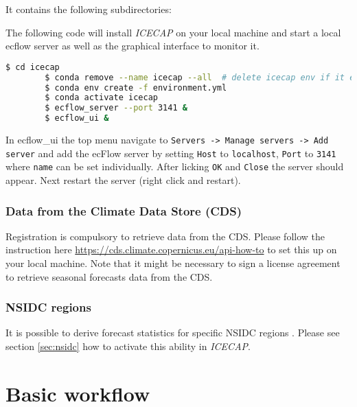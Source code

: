 \documentclass[DIV=10, parskip=full]{scrreprt}
\newcommand{\ice}{\textit{ICECAP}\xspace}
\begin{document}
It contains the following subdirectories:




The following code will install \ice on your local machine and start a local ecflow server as well as the graphical interface to monitor it.\\
	
	\begin{lstlisting}[language=bash]
		$ cd icecap
		$ conda remove --name icecap --all  # delete icecap env if it exists
		$ conda env create -f environment.yml 
		$ conda activate icecap
		$ ecflow_server --port 3141 &
		$ ecflow_ui & 
	\end{lstlisting}
	In ecflow\_ui the top menu navigate to \texttt{Servers -> Manage servers -> Add server} and add the ecFlow server by setting \texttt{Host} to \texttt{localhost}, \texttt{Port} to \texttt{3141} where \texttt{name} can be set individually. After licking \texttt{OK} and \texttt{Close} the server should appear. Next restart the server (right click and restart).\\
	
\subsection{Data from the Climate Data Store (CDS)}
\label{subsec:cds}
Registration is compulsory to retrieve data from the CDS. Please follow the instruction here \url{https://cds.climate.copernicus.eu/api-how-to} to set this up on your local machine. Note that it might be necessary to sign a license agreement to retrieve seasonal forecasts data from the CDS.
	
\subsection{NSIDC regions}
\label{subsec:nsidc}
It is possible to derive forecast statistics for specific NSIDC regions \citep{Meier2023}. Please see section \ref{sec:nsidc} how to activate this ability in \ice.



\chapter{Basic workflow}
\end{document}
